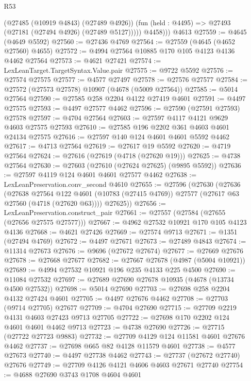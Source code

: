 \begin{lexlean}{R53}
\begin{coremodule}
            (@27485 (@10919 @4843) (@27489 @4926))
            (fun (held : @4495) => @27493 (@27181 (@27494 @4926) (@27489 @5127)))))
          @4458)))
    @4613
@27559 := @4645 (@4649 @5592)
@27560 := @27436 @4769
@27564 := @27559 (@4645 (@4652 @27560) @4655)
@27572 := @4994 @27564 @10885 @170 @105 @4123 @4136 @4462 @27564
@27573 := @4621 @27421
@27574 := LexLeanTarget.TargetSyntax.Value.pair
@27575 := @9722 @5592
@27576 := @27574 @27575
@27577 := @4577 @27497
@27578 := @27576 @27577
@27584 := @27572 (@27573 @27578) @10907 (@4678 (@5009 @27564))
@27585 := @5014 @27564
@27590 := @27585 @258 @2204 @4122 @27419 @4601
@27591 := @4497 @27575
@27593 := @4497 @27577 @4462
@27596 := @27590 (@27591 @27593) @27578
@27597 := @4704 @27564
@27603 := @27597 @4117 @4121 @9629 @4603 @27575 @27593
@27610 := @27585 @196 @2202 @361 @4603 @4601 @24134 @27575
@27616 := @27597 @140 @124 @4601 @4601 @5592 @4462
@27617 := @4713 @27564
@27619 := @27617 @19 @5592
@27620 := @4719 @27564
@27624 := @27616 (@27619 (@4718 (@27620 @19)))
@27625 := @4738 @27564
@27630 := @27603 (@27610 (@27624 @27625) (@9895 @5592))
@27636 := @27597 @4119 @124 @4601 @4601 @27577 @4462
@27638 := LexLeanPreservation.conv_second @4610
@27655 := @27596
    (@27630
      (@27636
        (@27638
          @27564
          @122
          @4601
          (@10783 (@27415 @4769))
          @27577
          (@27617 @63 @27560 (@4718 (@27620 @63))))
        @27625))
@27656 := LexLeanPreservation.construct_pair
@27661 := @27557 (@27584 (@27655 (@27656 @27575 @27577)))
@27667 := @4962 @27532 @10921 @170 @105 @4123 @4136
@27668 := @4621 @27426
@27669 := @27574 @9713
@27671 := @1351 (@27494 @4769)
@27672 := @4497 @27671
@27673 := @27489 @4843
@27674 := @11314 @27673
@27676 := @9696 (@27672 @27674)
@27677 := @27669 @27676
@27678 := @27668 @27677
@27682 := @27667 @27678 (@4987 (@5004 @10921))
@27689 := @4994 @27532 @10921 @196 @235 @4133 @225 @4500
@27690 := @11084 @27532
@27697 := @27689 @27690 @27678 @10935 (@4678 (@13734 @4500 @27532))
@27698 := @5014 @27690
@27703 := @27698 @258 @2204 @4132 @27424 @4601
@27705 := @4497 @27676 @4462
@27708 := @27703 (@9714 @27705) @27677
@27709 := @4704 @27690
@27715 := @27709 @2219 @4131 @4603 @27423 @9713 @27705
@27722 := @27698 @170 @2202 @124 @4601 @4601 @4462 @9713
@27723 := @4738 @27690
@27726 := @27715 (@27722 @27723 @9883)
@27732 := @27709 @4129 @124 @11581 @4601 @27676 @4462
@27737 := @27698 @665 @82 @4128 @11579 @4601
@27738 := @4577 @27673
@27740 := @4497 @27738 @4462
@27743 := @27737 (@27672 @27740) @27676
@27749 := @27709 @4126 @4121 @4606 @4603 @27671 @27740
@27754 := @4688 @27690 @3743 @1708 @4604 @4601

\end{coremodule}
\end{lexlean}
